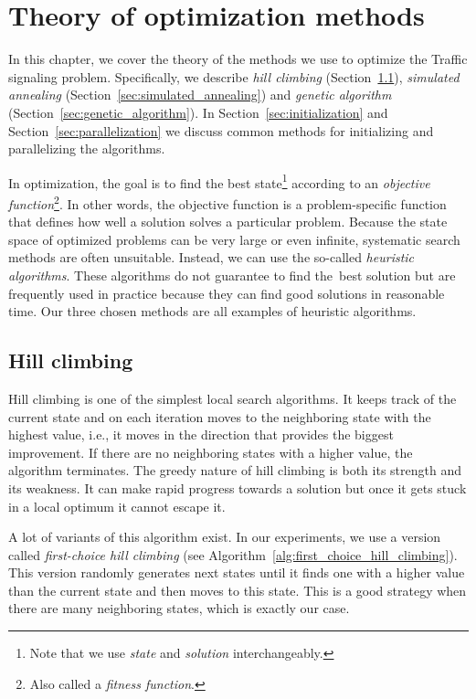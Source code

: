 \chapter{Theory of optimization methods} \label{chap:optimization_methods}

In this chapter, we cover the theory of the methods we use to optimize the Traffic signaling problem. Specifically, we describe \textit{hill climbing} (Section~\ref{sec:hill_climbing}), \textit{simulated annealing} (Section~\ref{sec:simulated_annealing}) and \textit{genetic algorithm} (Section~\ref{sec:genetic_algorithm}). In Section~\ref{sec:initialization} and Section~\ref{sec:parallelization} we discuss common methods for initializing and parallelizing the algorithms.

In optimization, the goal is to find the best state\footnote{Note that we use \textit{state} and \textit{solution} interchangeably.} according to an \textit{objective function}\footnote{Also called a \textit{fitness function}.}. In other words, the objective function is a problem-specific function that defines how well a solution solves a particular problem.
Because the state space of optimized problems can be very large or even infinite, systematic search methods are often unsuitable. Instead, we can use the so-called \textit{heuristic algorithms}. These algorithms do not guarantee to find
the~best
solution but are frequently used in practice because they can find good solutions in reasonable time. Our three chosen methods are all examples of heuristic algorithms.

\section{Hill climbing} \label{sec:hill_climbing}

Hill climbing \cite{russell2020artificial, luke2013essentials} is one of the simplest local search algorithms. It keeps track of the current state and on each iteration moves to the neighboring state with the highest value, i.e., it moves in the direction that provides the biggest improvement. If there are no neighboring states with a higher value, the algorithm terminates. The greedy nature of hill climbing is both its strength and its weakness. It can make rapid progress towards a solution but once it gets stuck in a local optimum it cannot escape it.

A lot of variants of this algorithm exist. In our experiments, we use a version called \textit{first-choice hill climbing} (see Algorithm~\ref{alg:first_choice_hill_climbing}). This version randomly generates next states until it finds one with a higher value than the current state and then moves to this state. This is a good strategy when there are many neighboring states, which is exactly our case.

